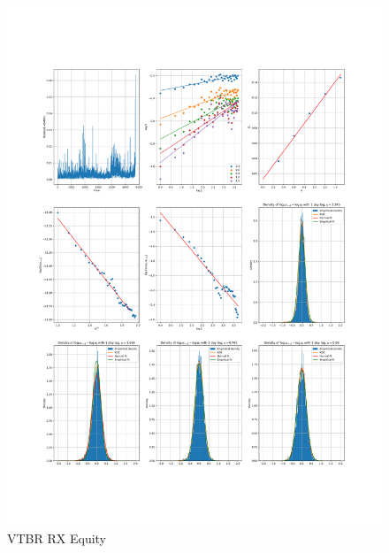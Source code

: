     \begin{figure}[h]
        \centering
        \includegraphics[width=\textwidth]{fig/VTBR RX Equity.pdf}
        \caption{VTBR RX Equity}
    \end{figure} 
        
